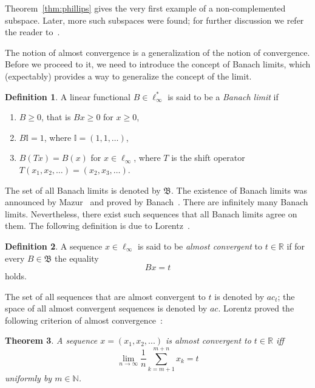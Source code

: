 \documentclass[a4paper,10pt]{article} %
\theoremstyle{plain}
\newtheorem{theorem}{Theorem}[section]
\theoremstyle{definition}
\newtheorem{definition}[theorem]{Definition}
\begin{document}
Theorem~\ref{thm:phillips} gives the very first example of a non-complemented subspace.
Later, more such subspaces were found;
for further discussion we refer the reader to~\cite[2.c--2.f]{lindenstrauss1977classical}.

The notion of almost convergence is a generalization of the notion of convergence.
Before we proceed to it, we need to introduce the concept of Banach limits,
which (expectably) provides a way to generalize the concept of the limit.

\begin{definition}
	A linear functional $B\in\ell_\infty^*$ is said to be a \emph{Banach limit} if
	\begin{enumerate}[label=(\roman*)]
		\item
			$B\geq0$, that is $Bx \geq 0$ for $x \geq 0$,
		\item
			$B\mathbb{I}=1$, where $\mathbb{I} =(1,1,\ldots)$,
		\item
			$B(Tx)=B(x)$ for $x\in \ell_\infty$,
			where $T$ is the shift operator $T(x_1,x_2,\ldots)=(x_2,x_3,\ldots)$.
	\end{enumerate}
\end{definition}
The set of all Banach limits is denoted by $\mathfrak{B}$.
The existence of Banach limits was announced by Mazur~\cite{Mazur} and proved by Banach~\cite{banach1993theorie}.
There are infinitely many Banach limits.
Nevertheless, there exist such sequences that all Banach limits agree on them.
The following definition is due to Lorentz~\cite{lorentz1948contribution}.

\begin{definition}
	A sequence $x\in \ell_\infty$ is said to be \emph{almost convergent} to $t\in \mathbb{R}$
	if for every $B\in\mathfrak{B}$ the equality
	\begin{equation}
		Bx = t
	\end{equation}
	holds.
\end{definition}
The set of all sequences that are almost convergent to $t$ is denoted by $ac_t$;
the space of all almost convergent sequences is denoted by $ac$.
Lorentz proved the following criterion of almost convergence~\cite{lorentz1948contribution}:

\begin{theorem}
	A sequence $x=(x_1,x_2,...)$ is almost convergent to $t\in\mathbb{R}$ iff
	\begin{equation}
		\label{eq:crit_Lorentz}
		\lim_{n\to\infty} \frac{1}{n} \sum_{k=m+1}^{m+n} x_k = t
	\end{equation}
	uniformly by $m\in\mathbb{N}$.
\end{theorem}
\end{document}
